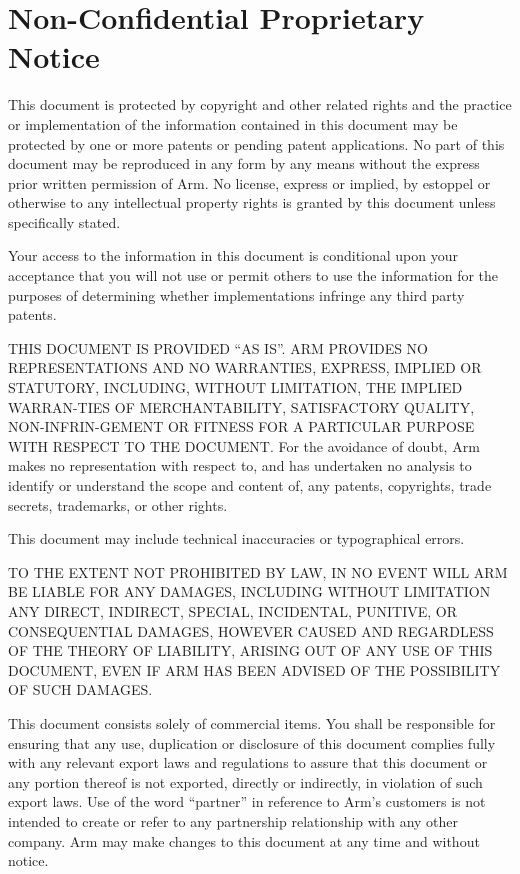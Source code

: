 \chapter{Non-Confidential Proprietary Notice}

This document is protected by copyright and other related rights and the
practice or implementation of the information contained in this document may be
protected by one or more patents or pending patent applications. No part of
this document may be reproduced in any form by any means without the express
prior written permission of Arm. No license, express or implied, by estoppel or
otherwise to any intellectual property rights is granted by this document
unless specifically stated.

Your access to the information in this document is conditional upon your
acceptance that you will not use or permit others to use the information for
the purposes of determining whether implementations infringe any third party
patents.

THIS DOCUMENT IS PROVIDED “AS IS”. ARM PROVIDES NO REPRESENTATIONS AND NO
WARRANTIES, EXPRESS, IMPLIED OR STATUTORY, INCLUDING, WITHOUT LIMITATION, THE
IMPLIED WARRAN-TIES OF MERCHANTABILITY, SATISFACTORY QUALITY, NON-INFRIN-GEMENT
OR FITNESS FOR A PARTICULAR PURPOSE WITH RESPECT TO THE DOCUMENT. For the
avoidance of doubt, Arm makes no representation with respect to, and has
undertaken no analysis to identify or understand the scope and content of, any
patents, copyrights, trade secrets, trademarks, or other rights.

This document may include technical inaccuracies or typographical errors.

TO THE EXTENT NOT PROHIBITED BY LAW, IN NO EVENT WILL ARM BE LIABLE FOR ANY
DAMAGES, INCLUDING WITHOUT LIMITATION ANY DIRECT, INDIRECT, SPECIAL,
INCIDENTAL, PUNITIVE, OR CONSEQUENTIAL DAMAGES, HOWEVER CAUSED AND REGARDLESS
OF THE THEORY OF LIABILITY, ARISING OUT OF ANY USE OF THIS DOCUMENT, EVEN IF
ARM HAS BEEN ADVISED OF THE POSSIBILITY OF SUCH DAMAGES.

This document consists solely of commercial items. You shall be responsible for
ensuring that any use, duplication or disclosure of this document complies
fully with any relevant export laws and regulations to assure that this
document or any portion thereof is not exported, directly or indirectly, in
violation of such export laws. Use of the word “partner” in reference to Arm’s
customers is not intended to create or refer to any partnership relationship
with any other company. Arm may make changes to this document at any time and
without notice.


